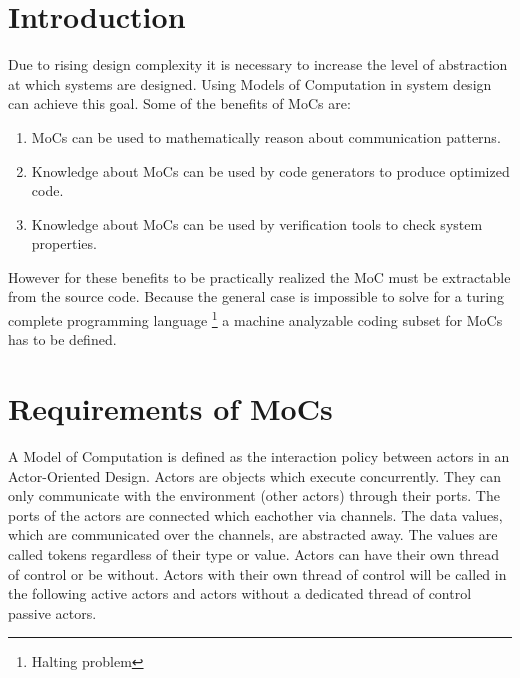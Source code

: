 \newcommand{\graphicPostfix}{pdf}
\newcommand{\resdir}{../../../HscdTeXRes/}
\newcommand{\code}[1]{{\bf #1}}



\usepackage{multirow}


\clearpage
\tableofcontents
\clearpage

\section{Introduction\label{intro}}
Due to rising design complexity it is necessary to increase
the level of abstraction at which systems are designed. Using
Models of Computation in system design can achieve this goal.
Some of the benefits of MoCs are:
\begin{enumerate}
\item MoCs can be used to mathematically reason about communication
patterns.

\item Knowledge about MoCs can be used by code generators to produce
optimized code.

\item Knowledge about MoCs can be used by verification tools to
check system properties.
\end{enumerate}
However for these benefits to be practically realized the
MoC must be extractable from the source code. Because the general case
is impossible to solve for a turing complete programming language
\footnote{Halting problem} a machine analyzable coding subset for
MoCs has to be defined.

\section{Requirements of MoCs}\label{Requirements of MoCs}

A Model of Computation is defined \cite{embsft:2002} as the 
interaction policy between actors in an Actor-Oriented Design.
Actors are objects which execute concurrently. They can only
communicate with the environment (other actors) through their ports.
The ports of the actors are connected which eachother via channels.
The data values, which are communicated over the channels,
are abstracted away. The values are called tokens regardless
of their type or value.
Actors can have their own thread of control or be without. Actors
with their own thread of control will be called in the following
active actors and actors without a dedicated thread of control
passive actors.

